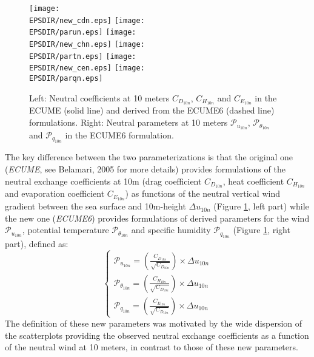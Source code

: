 

\begin{figure}
 \centering\texttt{[image: \\EPSDIR/new\_cdn.eps]}
 \centering\texttt{[image: \\EPSDIR/parun.eps]}
 \centering\texttt{[image: \\EPSDIR/new\_chn.eps]}
 \centering\texttt{[image: \\EPSDIR/partn.eps]}
 \centering\texttt{[image: \\EPSDIR/new\_cen.eps]}
 \centering\texttt{[image: \\EPSDIR/parqn.eps]}
	\caption{Left: Neutral coefficients at 10 meters $C_{D_{10n}}$, $C_{H_{10n}}$ and $C_{E_{10n}}$ in the ECUME 
	(solid line) and derived from the ECUME6 (dashed line) formulations. 
	Right: Neutral parameters at 10 meters $\mathcal{P}_{u_{10n}}$, $\mathcal{P}_{{\theta}_{10n}}$ and $\mathcal{P}_{q_{10n}}$ 
	in the ECUME6 formulation.\label{ecume_coef}}
\end{figure}

The key difference between the two parameterizations is that the original one (\textit{ECUME}, see Belamari, 2005 %
for more details) provides formulations
of the neutral exchange coefficients at 10m (drag coefficient $C_{D_{10n}}$, heat coefficient $C_{H_{10n}}$ and 
evaporation coefficient $C_{E_{10n}}$) as functions of the neutral vertical wind gradient between the sea surface and 
10m-height $\Delta u_{10n}$ 
(Figure \ref{ecume_coef}, left part) while the new one (\textit{ECUME6}) provides formulations of derived parameters for the wind
$\mathcal{P}_{u_{10n}}$, potential temperature $\mathcal{P}_{{\theta}_{10n}}$ and specific humidity $\mathcal{P}_{q_{10n}}$
(Figure \ref{ecume_coef}, right part), defined as:
\begin{equation}
\left\{
\begin{array}{l}
	\mathcal{P}_{u_{10n}}=\left(\frac{C_{D_{10n}}}{\sqrt{C_{D_{10n}}}}\right)\times \Delta u_{10n} \\
	\mathcal{P}_{{\theta}_{10n}}=\left(\frac{C_{H_{10n}}}{\sqrt{C_{D_{10n}}}}\right)\times \Delta u_{10n} \\
	\mathcal{P}_{q_{10n}}=\left(\frac{C_{E_{10n}}}{\sqrt{C_{D_{10n}}}}\right)\times \Delta u_{10n} 
\end{array}
\right.
\end{equation}
The definition of these new parameters was motivated by the wide dispersion of the scatterplots providing the observed 
neutral exchange coefficients as a function of the neutral wind at 10 meters, in contrast to those of these new
parameters.\\

